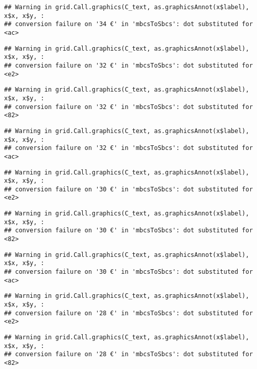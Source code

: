 \documentclass[
]{article}
\begin{document}
\begin{verbatim}
## Warning in grid.Call.graphics(C_text, as.graphicsAnnot(x$label), x$x, x$y, :
## conversion failure on '34 €' in 'mbcsToSbcs': dot substituted for <ac>
\end{verbatim}

\begin{verbatim}
## Warning in grid.Call.graphics(C_text, as.graphicsAnnot(x$label), x$x, x$y, :
## conversion failure on '32 €' in 'mbcsToSbcs': dot substituted for <e2>
\end{verbatim}

\begin{verbatim}
## Warning in grid.Call.graphics(C_text, as.graphicsAnnot(x$label), x$x, x$y, :
## conversion failure on '32 €' in 'mbcsToSbcs': dot substituted for <82>
\end{verbatim}

\begin{verbatim}
## Warning in grid.Call.graphics(C_text, as.graphicsAnnot(x$label), x$x, x$y, :
## conversion failure on '32 €' in 'mbcsToSbcs': dot substituted for <ac>
\end{verbatim}

\begin{verbatim}
## Warning in grid.Call.graphics(C_text, as.graphicsAnnot(x$label), x$x, x$y, :
## conversion failure on '30 €' in 'mbcsToSbcs': dot substituted for <e2>
\end{verbatim}

\begin{verbatim}
## Warning in grid.Call.graphics(C_text, as.graphicsAnnot(x$label), x$x, x$y, :
## conversion failure on '30 €' in 'mbcsToSbcs': dot substituted for <82>
\end{verbatim}

\begin{verbatim}
## Warning in grid.Call.graphics(C_text, as.graphicsAnnot(x$label), x$x, x$y, :
## conversion failure on '30 €' in 'mbcsToSbcs': dot substituted for <ac>
\end{verbatim}

\begin{verbatim}
## Warning in grid.Call.graphics(C_text, as.graphicsAnnot(x$label), x$x, x$y, :
## conversion failure on '28 €' in 'mbcsToSbcs': dot substituted for <e2>
\end{verbatim}

\begin{verbatim}
## Warning in grid.Call.graphics(C_text, as.graphicsAnnot(x$label), x$x, x$y, :
## conversion failure on '28 €' in 'mbcsToSbcs': dot substituted for <82>
\end{verbatim}
\end{document}
